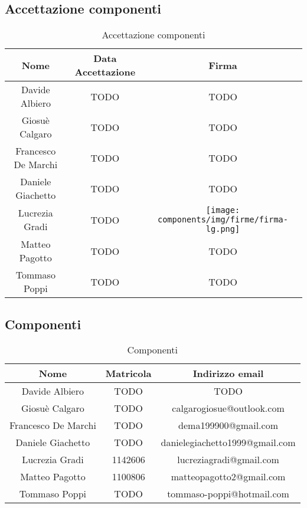 \subsection{Accettazione componenti}

\renewcommand{\arraystretch}{1}
	\begin{table}[H]
		\begin{center}
			\setlength{\aboverulesep}{0pt}
			\setlength{\belowrulesep}{0pt}
			\setlength{\extrarowheight}{.75ex}
			\begin{tabular}{ c c c}
				\rowcolor{AzzurroGruppo!30} 
				\textbf{Nome} & \textbf{Data Accettazione} & \textbf{Firma} \\
				\toprule
				Davide Albiero & TODO & TODO \\
                Giosuè Calgaro & TODO & TODO \\
                Francesco De Marchi & TODO & TODO \\
                Daniele Giachetto & TODO & TODO \\
                Lucrezia Gradi & TODO & \texttt{[image: components/img/firme/firma-lg.png]} \\
				Matteo Pagotto & TODO & TODO \\
                Tommaso Poppi & TODO & TODO \\
				\bottomrule
			\end{tabular}
			\caption{Accettazione componenti}
		\end{center}
    \end{table}

\subsection{Componenti}

\renewcommand{\arraystretch}{1}
	\begin{table}[H]
		\begin{center}
			\setlength{\aboverulesep}{0pt}
			\setlength{\belowrulesep}{0pt}
			\setlength{\extrarowheight}{.75ex}
			\begin{tabular}{ c c c }
				\rowcolor{AzzurroGruppo!30} 
				\textbf{Nome} & \textbf{Matricola} & \textbf{Indirizzo email}\\
				\toprule
                Davide Albiero & TODO & TODO \\
                Giosuè Calgaro & TODO & calgarogiosue@outlook.com \\
                Francesco De Marchi & TODO & dema199900@gmail.com \\
                Daniele Giachetto & TODO & danielegiachetto1999@gmail.com \\
                Lucrezia Gradi & 1142606 & lucreziagradi@gmail.com \\
				Matteo Pagotto & 1100806 & matteopagotto2@gmail.com \\
                Tommaso Poppi & TODO & tommaso-poppi@hotmail.com \\
				\bottomrule
			\end{tabular}
			\caption{Componenti}
		\end{center}
    \end{table}